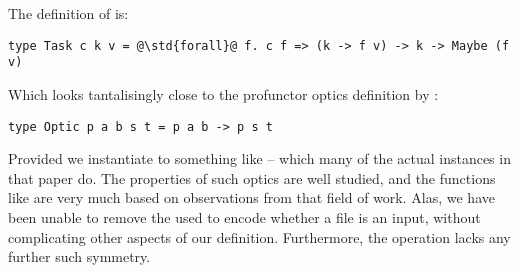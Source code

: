 The definition of  is:

\begin{verbatim}
type Task c k v = @\std{forall}@ f. c f => (k -> f v) -> k -> Maybe (f v)
\end{verbatim}

Which looks tantalisingly close to the profunctor optics definition by \citet{gibbons-profunctor-optics}:

\begin{verbatim}
type Optic p a b s t = p a b -> p s t
\end{verbatim}

Provided we instantiate  to something like  -- which many of the actual instances in that paper do. The properties of such optics are well studied, and the functions like  are very much based on observations from that field of work. Alas, we have been unable to remove the  used to encode whether a file is an input, without complicating other aspects of our definition. Furthermore, the  operation lacks any further such symmetry.

%
